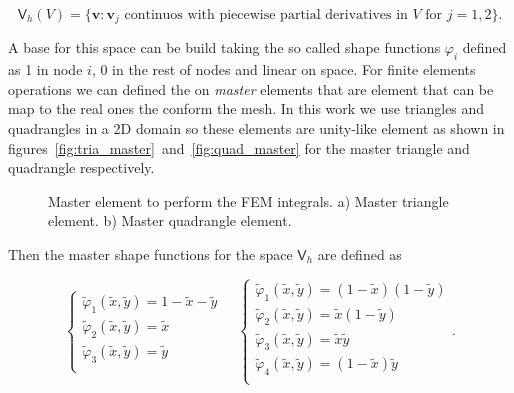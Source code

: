 \documentclass[preprint]{elsarticle}
\begin{document}
\begin{equation}
\bm{\mathsf{V}}_h(V) = \{ 
  \bm{v} : \bm{v}_j \text{ continuos with piecewise partial derivatives in } V
  \text{ for } j=1,2
\}.
\end{equation}

A base for this space can be build taking the so called shape functions
$\varphi_i$ defined as 1 in node $i$, 0 in the rest of nodes and linear on
space. For finite elements operations we can defined the on \emph{master}
elements that are element that can be map to the real ones the conform the mesh.
In this work we use triangles and quadrangles in a 2D domain so these elements
are unity-like element as shown in
figures~\ref{fig:tria_master}~and~\ref{fig:quad_master} for the master triangle
and quadrangle respectively.


\begin{figure}[!ht]
\begin{minipage}[b]{0.4\linewidth}
\subcaptionbox{\label{fig:tria_master}}{
\resizebox{4.0cm}{!}{}}
\end{minipage}
\hspace{1.5cm}
\begin{minipage}[b]{0.4\linewidth}
\subcaptionbox{\label{fig:quad_master}}{
\resizebox{4.0cm}{!}{}}
\end{minipage}
\caption{Master element to perform the FEM integrals.
a) Master triangle element. 
b) Master quadrangle element.
}
\label{fig_dist_scheme}
\end{figure}


Then the master shape functions for the space $\bm{\mathsf{V}}_h$ are defined as

\begin{equation}
\left\{
\begin{array}{ll}
\tilde{\varphi}_1(\tilde{x},\tilde{y}) = 1 - \tilde{x} - \tilde{y}\\
\tilde{\varphi}_2(\tilde{x},\tilde{y}) = \tilde{x}\\
\tilde{\varphi}_3(\tilde{x},\tilde{y}) = \tilde{y}\\
\end{array}
\right.
\quad
\left\{
\begin{array}{ll}
\tilde{\varphi}_1(\tilde{x},\tilde{y}) = (1 - \tilde{x})(1 - \tilde{y})\\
\tilde{\varphi}_2(\tilde{x},\tilde{y}) = \tilde{x}(1 - \tilde{y})\\
\tilde{\varphi}_3(\tilde{x},\tilde{y}) = \tilde{x}\tilde{y}\\
\tilde{\varphi}_4(\tilde{x},\tilde{y}) = (1 - \tilde{x})\tilde{y}\\
\end{array}
\right.
.
\end{equation}
\end{document}
